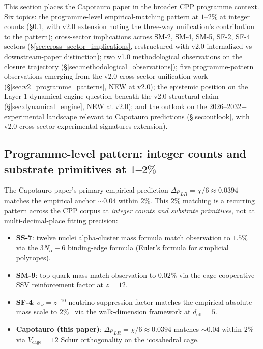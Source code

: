 \documentclass[11pt,letterpaper]{article}
\newcommand{\DeltapLR}{\Delta p_{LR}}
\newcommand{\sigmanu}{\sigma_\nu}
\begin{document}
This section places the Capotauro paper in the broader CPP programme context. Six topics: the programme-level empirical-matching pattern at $1$--$2\%$ at integer counts (\S\ref{sec:programme_pattern}, with v2.0 extension noting the three-way unification's contribution to the pattern); cross-sector implications across SM-2, SM-4, SM-5, SF-2, SF-4 sectors (\S\ref{sec:cross_sector_implications}, restructured with v2.0 internalized-vs-downstream-paper distinction); two v1.0 methodological observations on the closure trajectory (\S\ref{sec:methodological_observations}); five programme-pattern observations emerging from the v2.0 cross-sector unification work (\S\ref{sec:v2_programme_patterns}, NEW at v2.0); the epistemic position on the Layer 1 dynamical-engine question beneath the v2.0 structural claim (\S\ref{sec:dynamical_engine}, NEW at v2.0); and the outlook on the 2026--2032+ experimental landscape relevant to Capotauro predictions (\S\ref{sec:outlook}, with v2.0 cross-sector experimental signatures extension).

\subsection{Programme-level pattern: integer counts and substrate primitives at $1$--$2\%$}\label{sec:programme_pattern}

The Capotauro paper's primary empirical prediction $\DeltapLR = \chi/6 \approx 0.0394$ matches the empirical anchor $\sim 0.04$ within $2\%$. This $2\%$ matching is a recurring pattern across the CPP corpus at \emph{integer counts and substrate primitives}, not at multi-decimal-place fitting precision:

\begin{itemize}\setlength\itemsep{0.2em}
    \item \textbf{SS-7}: twelve nuclei alpha-cluster mass formula match observation to $1.5\%$~\cite{abshier_ss7} via the $3N_\alpha - 6$ binding-edge formula (Euler's formula for simplicial polytopes).
    \item \textbf{SM-9}: top quark mass match observation to $0.02\%$ via the cage-cooperative SSV reinforcement factor at $z = 12$.
    \item \textbf{SF-4}: $\sigmanu = z^{-10}$ neutrino suppression factor matches the empirical absolute mass scale to $2\%$~\cite{abshier_sf4} via the walk-dimension framework at $d_\text{eff} = 5$.
    \item \textbf{Capotauro (this paper)}: $\DeltapLR = \chi/6 \approx 0.0394$ matches $\sim 0.04$ within $2\%$ via $V_\text{cage} = 12$ Schur orthogonality on the icosahedral cage.
\end{itemize}
\end{document}
